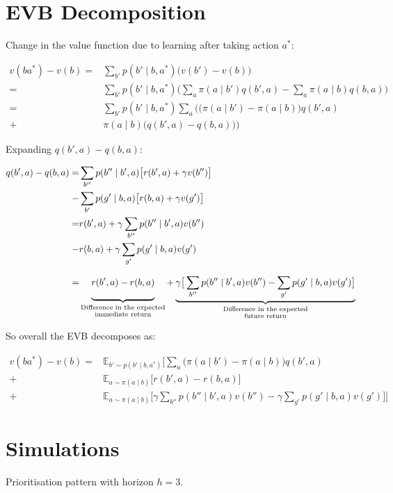 \documentclass{article}
\begin{document}
\section*{EVB Decomposition}
Change in the value function due to learning after taking action $a^*$:

\begin{align}
v(ba^*)-v(b)=&\sum_{b'}p(b'\mid b, a^*)\Big(v(b')-v(b)\Big)\\
=&\sum_{b'}p(b'\mid b, a^*)\Big(\sum_a \pi(a\mid b')q(b', a)-\sum_{a} \pi(a\mid b)q(b,a)\Big) \nonumber \\
=&\sum_{b'}p(b'\mid b, a^*)\sum_a\Big(\big(\pi(a\mid b')-\pi(a\mid b)\big)q(b',a) \nonumber \\
+&\pi(a\mid b)\big(q(b', a) - q(b, a)\big)\Big) \nonumber
\end{align}

Expanding $q(b', a) - q(b, a)$:

\begin{align}
q(b', a)-q(b, a)=&\sum_{b''}p(b''\mid b', a)\big[r(b',a) + \gamma v(b'')\big]\\
-&\sum_{b'}p(g'\mid b, a)\big[r(b,a) + \gamma v(g')\big]\nonumber\\
=& r(b',a) + \gamma \sum_{b''}p(b''\mid b', a)v(b'')\nonumber \\
-& r(b,a) + \gamma \sum_{g'}p(g'\mid b, a)v(g')\nonumber \\
=& \underbrace{\vphantom{ \left(\frac{a^{\frac{0.3}{`}}}{b}\right)} r(b',a) - r(b,a)}_{\substack{\text{Difference in the expected} \\ \text{immediate return}}} + \underbrace{\gamma \big[ \sum_{b''}p(b''\mid b', a)v(b'') - \sum_{g'}p(g'\mid b, a)v(g') \big]}_{\substack{\text{Difference in the expected} \\ \text{future return}}}\nonumber
\end{align}

So overall the EVB decomposes as:

\begin{align}
    v(ba^*)-v(b) =& \mathbb{E}_{b'\sim p(b'\mid b, a^*)}\Big[\sum_a \big(\pi(a\mid b')-\pi(a\mid b)\big)q(b',a) \\
    +& \mathbb{E}_{a\sim \pi(a\mid b)}\big[r(b',a) - r(b,a)\big] \nonumber \\ 
    +& \mathbb{E}_{a\sim \pi(a\mid b)}\big[\gamma \sum_{b''}p(b''\mid b', a)v(b'') - \gamma \sum_{g'}p(g'\mid b, a)v(g') \big] \Big] \nonumber
\end{align}

\newpage
\section*{Simulations}

Prioritisation pattern with horizon $h=3$.
\vspace{1cm}






\end{document}
